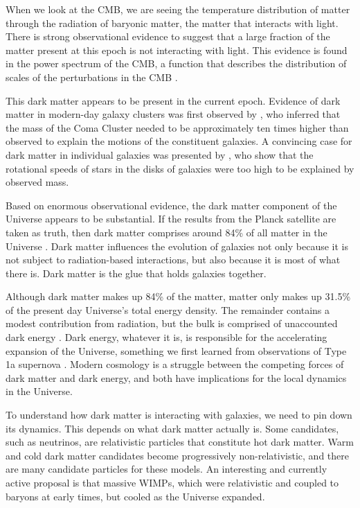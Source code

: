 When we look at the CMB, we are seeing the temperature distribution of matter through the radiation of baryonic matter, the matter that interacts with light. There is strong observational evidence to suggest that a large fraction of the matter present at this epoch is not interacting with light. This evidence is found in the power spectrum of the CMB, a function that describes the distribution of scales of the perturbations in the CMB \citep{transfer_fn}. 

This dark matter appears to be present in the current epoch. Evidence of dark matter in modern-day galaxy clusters was first observed by \citet{zwicky_1933}, who inferred that the mass of the Coma Cluster needed to be approximately ten times higher than observed to explain the motions of the constituent galaxies. A convincing case for dark matter in individual galaxies was presented by \citet{rubin_1980}, who show that the rotational speeds of stars in the disks of galaxies were too high to be explained by observed mass.

Based on enormous observational evidence, the dark matter component of the Universe appears to be substantial. If the results from the Planck satellite are taken as truth, then dark matter comprises around 84\% of all matter in the Universe \citep{planck_2018}. Dark matter influences the evolution of galaxies not only because it is not subject to radiation-based interactions, but also because it is most of what there is. Dark matter is the glue that holds galaxies together.  

Although dark matter makes up 84\% of the matter, matter only makes up 31.5\% of the present day Universe's total energy density. The remainder contains a modest contribution from radiation, but the bulk is comprised of unaccounted dark energy \citep{kolb_turner,dodelson, BT}. Dark energy, whatever it is, is responsible for the accelerating expansion of the Universe, something we first learned from observations of Type 1a supernova \citep{reiss_1998,perlmutter_1999}. Modern cosmology is a struggle between the competing forces of dark matter and dark energy, and both have implications for the local dynamics in the Universe.

To understand how dark matter is interacting with galaxies, we need to pin down its dynamics. This depends on what dark matter actually is. Some candidates, such as neutrinos, are relativistic particles that constitute hot dark matter. Warm and cold dark matter candidates become progressively non-relativistic, and there are many candidate particles for these models. An interesting and currently active proposal is that massive WIMPs, which were relativistic and coupled to baryons at early times, but cooled as the Universe expanded.

